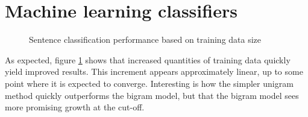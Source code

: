 \documentclass[a4paper,11pt]{kth-mag}
\begin{document}
\section{Machine learning classifiers}

\begin{figure}[h!]
  \centering

  \caption{Sentence classification performance based on training data size}
  \label{fig:data_size}
\end{figure}


As expected, figure \ref {fig:data_size} shows that increased quantities of training data quickly yield improved results. This increment appears approximately linear, up to some point where it is expected to converge. Interesting is how the simpler unigram method quickly outperforms the bigram model, but that the bigram model sees more promising growth at the cut-off.

\newpage
\end{document}

